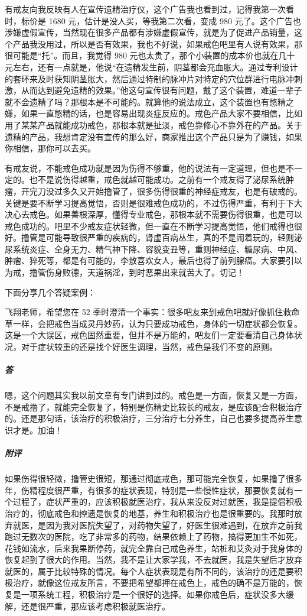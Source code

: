有戒友向我反映有人在宣传遗精治疗仪，这个广告我也看到过，记得我第一次看时，标价是 1680 元，估计是没人买，等我第二次看，变成 980 元了。这个广告也涉嫌虚假宣传，当然现在很多产品都有涉嫌虚假宣传，就是为了促进产品销量，这个产品我没用过，所以是否有效果，我也不好说，如果戒色吧里有人说有效果，那很可能是“托”。而且，我觉得 980 元也太贵了，那个小装置的成本价也就在几十元左右，还有一点就是，他说“在遗精发生前，阴茎都会充血胀大。通过专利设计的套环来及时获知阴茎胀大，然后通过特制的脉冲片对特定的穴位群进行电脉冲刺激，从而达到避免遗精的效果。”他这句宣传很有问题，戴了这个装置，难道一辈子就不会遗精了吗？那根本是不可能的。就算他的说法成立，这个装置也有憋精之嫌，如果一直憋精的话，也是容易出现炎症反应的。戒色产品大家不要相信，比如用了某某产品就能成功戒色，那根本就是扯淡，戒色靠修心不靠外在的产品。关于遗精的产品，我想肯定没有宣传的那么好，商家推出这个产品只是为了赚钱，如果你相信，那你可以去买。

有戒友说，不能戒色成功就是因为伤得不够重，他的说法有一定道理，但也是不一定的。也不是说伤得越重，戒色就越可能成功。之前有一个戒友得了泌尿系统肿瘤，开完刀没过多久又开始撸管了，很多伤得很重的神经症戒友，也是有破戒的。关键是要不断学习提高觉悟，否则是很难戒色成功的，不过伤得严重，有利于下大决心去戒色。如果善根深厚，懂得专业戒色，那根本就不需要伤得很重，也是可以戒色成功的。吧里不少戒友症状轻微，但一直在不断学习提高觉悟，他们戒得也很好。撸管是可能导致很严重的疾病的，肾虚百病丛生，真的不是闹着玩的，轻则泌尿系统炎症、全身无力、精气神下降、容貌变丑等，重则神经症、糖尿病、中风、肿瘤、猝死等，都是有可能的，李敖喜欢女人，最后也得了前列腺癌。大家要引以为戒，撸管伤身败德，天道祸淫，到时恶果出来就苦大了。切记！

下面分享几个答疑案例：

\begin{case}
    飞翔老师，希望您在 52 季时澄清一个事实：很多吧友来到戒色吧就好像抓住救命草一样，会把戒色当成灵丹妙药，认为只要成功戒色，身体的一切症状都会恢复。这是一个大误区，戒色固然重要，但并不是万能的，吧友们一定要看清自己身体状况，对于症状较重的还是找个好医生调理，当然，戒色是我们不变的原则。
    \subparagraph{答} 嗯，这个问题其实我以前文章有专门讲到过的。戒色是一方面，恢复又是一方面，不是戒撸了，就能完全恢复了，特别是伤精史比较长的戒友，是应该配合积极治疗的。还是那句话，该治疗的积极治疗，三分治疗七分养生，自己也要多提高养生意识才是。加油！
    \subparagraph{附评} 如果伤得很轻微，撸管史很短，那通过彻底戒色，那可能完全恢复，如果撸了很多年，伤精程度很严重，有很多的症状表现，特别是一些慢性症状，那要恢复就有一个过程了，症状严重的，应该积极就医治疗，我从来没反对过就医，我是提倡积极治疗的，彻底戒色和控遗是恢复的地基，养生和积极治疗也是很重要的。我那时放弃就医，是因为我对医院失望了，对药物失望了，好医生很难遇到，在放弃之前我跑过无数次的医院，吃了非常多的药物，结果依赖上了药物，搞得更加生不如死，花钱如流水，后来我果断停药，就完全靠自己戒色养生，站桩和艾灸对于我身体的恢复起到了很大的作用。当然，我不是让大家学我，不去就医，我是失望后才放弃就医的，属于比较特殊的情况。每个人症状表现是有所不同的，该治疗的还是要积极治疗，就像这位戒友所言，不要把希望都押在戒色上，戒色的确不是万能的，恢复是一项系统工程，积极治疗是一个很好的选择。如果你戒色后，症状没多大缓解，还是很严重，那应该考虑积极就医治疗。
\end{case}


